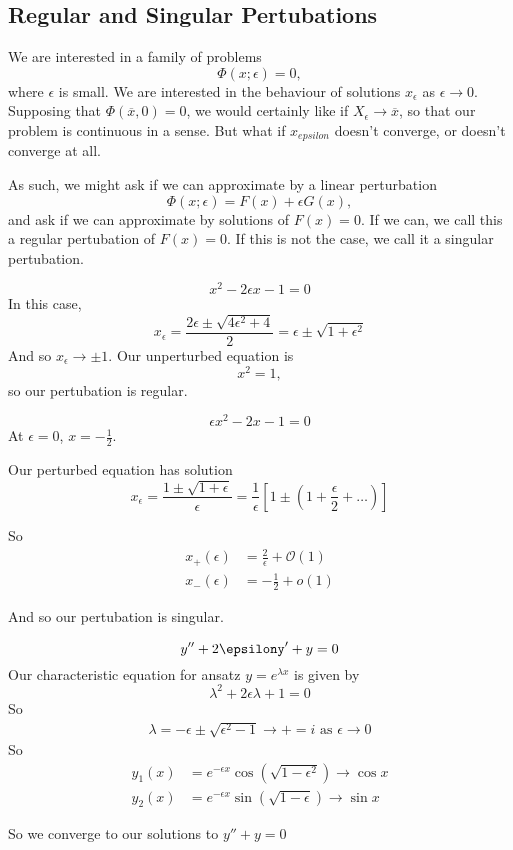 \documentclass[a4paper]{article}
\begin{document}
\subsection{Regular and Singular Pertubations}

We are interested in a family of problems
\[
	\Phi(x; \epsilon) = 0
,\] where $\epsilon$ is small. We are interested in the behaviour of solutions $x_{\epsilon}$ as $\epsilon \to 0$. 
Supposing that $\Phi(\overline{x}, 0) = 0$, we would certainly like if $X_{\epsilon} \to \overline{x}$, so that our problem is continuous in a sense. But what if $x_{epsilon}$ doesn't converge, or doesn't converge at all.

As such, we might ask if we can approximate by a linear perturbation
\[
	\Phi(x; \epsilon) = F(x) + \epsilon G(x)
,\] and ask if we can approximate by solutions of $F(x) = 0$. If we can, we call this a regular pertubation of $F(x) = 0$. If this is not the case, we call it a singular pertubation. 

\begin{eg}
	\[
	x^2 - 2\epsilon x -1 =0
	\]
	In this case, \[
	x_{\epsilon} = \frac{2\epsilon \pm \sqrt{4\epsilon^2 + 4} }{2} = \epsilon \pm \sqrt{1 + \epsilon^2} 
	\] 
	And so  $x_{\epsilon} \to \pm 1$. Our unperturbed equation is
	\[
	x^2 = 1
	,\] so our pertubation is regular.
\end{eg}

\begin{eg}
	\[
	\epsilon x^2 -2x - 1 = 0
	\] 
	At $\epsilon = 0$, $x = -\frac{1}{2}$.

	Our perturbed equation has solution
	\[
		x_{\epsilon} = \frac{1 \pm \sqrt{1+\epsilon} }{\epsilon} = \frac{1}{\epsilon} \left[ 1 \pm \left( 1 + \frac{\epsilon}{2} + \ldots \right)  \right] 
	\] 

	So
	\begin{align*}
		x_{+}(\epsilon) &= \frac{2}{\epsilon} + \mathcal{O}(1) \\
		x_{-}(\epsilon) &= -\frac{1}{2} + o(1)
	\end{align*}

	And so our pertubation is singular.
\end{eg}

\begin{eg}
	\[
	y'' + 2\epsilony' + y = 0
	\]
	Our characteristic equation for ansatz $y = e^{\lambda x}$ is given by
	\[
	\lambda^2 + 2\epsilon\lambda + 1= 0
	\]
	So
	\begin{align*}
		\lambda = -\epsilon \pm \sqrt{\epsilon^2 -1} \to += i \text{ as } \epsilon \to 0 
	\end{align*}
	So
	\begin{align*}
		y_1(x) &= e^{-\epsilon x} \cos\left( \sqrt{1-\epsilon^2}  \right) \to \cos x \\
		y_2(x) &= e^{-\epsilon x} \sin\left( \sqrt{1 - \epsilon}  \right) \to \sin x
	\end{align*}

	So we converge to our solutions to $y'' + y =0$
\end{eg}
\end{document}
